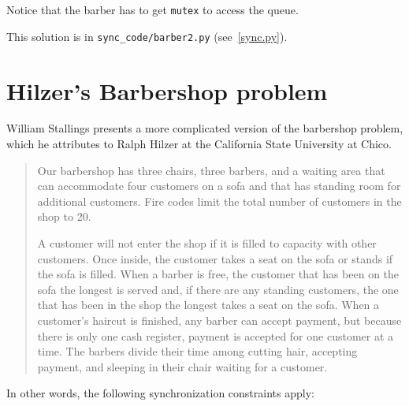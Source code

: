 \documentclass{book}
\newcommand{\clearemptydoublepage}{\newpage\cleardoublepage}
\begin{document}
Notice that the barber has to get {\tt mutex} to access the
queue.

This solution is in \verb"sync_code/barber2.py" (see~\ref{sync.py}).


\clearemptydoublepage
\section {Hilzer's Barbershop problem}

William Stallings \cite{stallings} presents a more complicated version
of the barbershop problem, which he attributes to Ralph Hilzer at the
California State University at Chico.

\begin{quotation}
Our barbershop has three chairs, three barbers, and a waiting
area that can accommodate four customers on a sofa and that has
standing room for additional customers.  Fire codes limit the
total number of customers in the shop to 20.

A customer will not enter the shop if it is filled to capacity with
other customers.  Once inside, the customer takes a seat on the sofa
or stands if the sofa is filled.  When a barber is free, the customer
that has been on the sofa the longest is served and, if there are any
standing customers, the one that has been in the shop the longest
takes a seat on the sofa.  When a customer's haircut is finished, any
barber can accept payment, but because there is only one cash
register, payment is accepted for one customer at a time.  The barbers
divide their time among cutting hair, accepting payment, and sleeping
in their chair waiting for a customer.
\end{quotation}


In other words, the following synchronization constraints apply:
\end{document}

